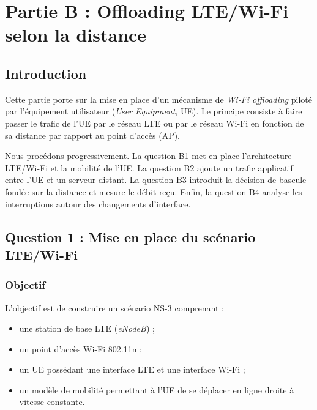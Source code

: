 

\chapter{Partie B : Offloading LTE/Wi-Fi selon la distance}
\label{chap:partie-b-yassine}

\section{Introduction}

Cette partie porte sur la mise en place d'un mécanisme de
\textit{Wi-Fi offloading} piloté par l'équipement utilisateur
(\textit{User Equipment}, UE). Le principe consiste à faire
passer le trafic de l'UE par le réseau LTE ou par le réseau
Wi-Fi en fonction de sa distance par rapport au point d'accès
(AP).

Nous procédons progressivement. La question B1 met en place
l'architecture LTE/Wi-Fi et la mobilité de l'UE. La question B2
ajoute un trafic applicatif entre l'UE et un serveur distant.
La question B3 introduit la décision de bascule fondée sur la
distance et mesure le débit reçu. Enfin, la question B4
analyse les interruptions autour des changements d'interface.

\section{Question 1 : Mise en place du scénario LTE/Wi-Fi}

\subsection{Objectif}

L'objectif est de construire un scénario NS-3 comprenant :
\begin{itemize}
    \item une station de base LTE (\textit{eNodeB}) ;
    \item un point d'accès Wi-Fi 802.11n ;
    \item un UE possédant une interface LTE et une interface Wi-Fi ;
    \item un modèle de mobilité permettant à l'UE de se déplacer
    en ligne droite à vitesse constante.
\end{itemize}

